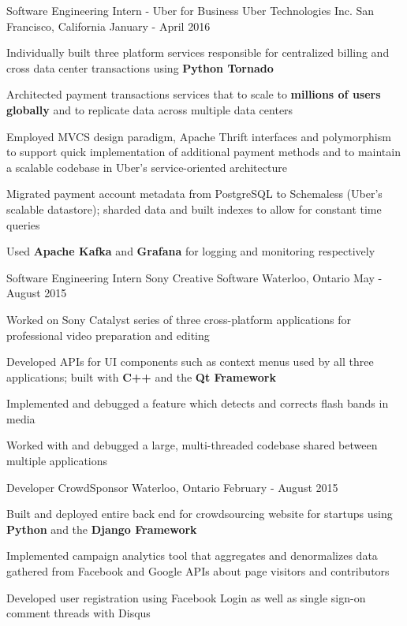 \begin{cventries}
  \cventry
    {Software Engineering Intern - Uber for Business}
    {Uber Technologies Inc.}
    {San Francisco, California}
    {January - April 2016}
    {
      \begin{cvitems}
      \item Individually built three platform services responsible for centralized billing and cross data center transactions using \textbf{Python Tornado}
      \item Architected payment transactions services that to scale to \textbf{millions of users globally} and to replicate data across multiple data centers
      \item Employed MVCS design paradigm, Apache Thrift interfaces and polymorphism to support quick implementation of additional payment methods and to maintain a scalable codebase in Uber's service-oriented architecture
      \item Migrated payment account metadata from PostgreSQL to Schemaless (Uber's scalable datastore); sharded data and built indexes to allow for constant time queries
      \item Used \textbf{Apache Kafka} and \textbf{Grafana} for logging and monitoring respectively
      \end{cvitems}
    }
  \cventry
    {Software Engineering Intern}
    {Sony Creative Software}
    {Waterloo, Ontario}
    {May - August 2015}
    {
      \begin{cvitems}
        \item Worked on Sony Catalyst series of three cross-platform applications for professional video preparation and editing
        \item Developed APIs for UI components such as context menus used by all three applications; built with \textbf{C++} and the \textbf{Qt Framework}
        \item Implemented and debugged a feature which detects and corrects flash bands in media
        \item Worked with and debugged a large, multi-threaded codebase shared between multiple applications
      \end{cvitems}
    }
  \cventry
    {Developer}
    {CrowdSponsor}
    {Waterloo, Ontario}
    {February - August 2015}
    {
      \begin{cvitems}
      \item Built and deployed entire back end for crowdsourcing website for startups using \textbf{Python} and the \textbf{Django Framework}
        \item Implemented campaign analytics tool that aggregates and denormalizes data gathered from Facebook and Google APIs about page visitors and contributors
        \item Developed user registration using Facebook Login as well as single sign-on comment threads with Disqus
      \end{cvitems}
    }
\end{cventries}
